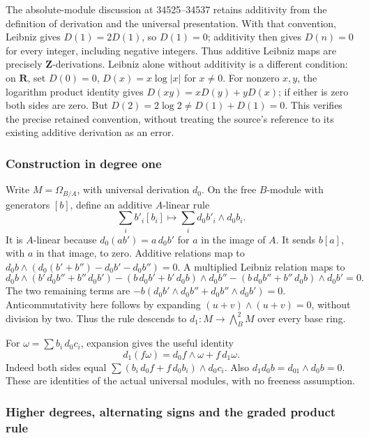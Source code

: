 The absolute-module discussion at 34525--34537 retains additivity from the definition of derivation and the universal presentation. With that convention, Leibniz gives \(D(1)=2D(1)\), so \(D(1)=0\); additivity then gives \(D(n)=0\) for every integer, including negative integers. Thus additive Leibniz maps are precisely \(\mathbf Z\)-derivations. Leibniz alone without additivity is a different condition: on \(\mathbf R\), set \(D(0)=0\), \(D(x)=x\log|x|\) for \(x\ne0\). For nonzero \(x,y\), the logarithm product identity gives \(D(xy)=xD(y)+yD(x)\); if either is zero both sides are zero. But \(D(2)=2\log2\ne D(1)+D(1)=0\). This verifies the precise retained convention, without treating the source's reference to its existing additive derivation as an error.

\subsubsection{Construction in degree one}\label{algebra-proof-042-construction-in-degree-one}

Write \(M=\Omega_{B/A}\), with universal derivation \(d_0\). On the free \(B\)-module with generators \([b]\), define an additive \(A\)-linear rule \[
\sum_i b'_i[b_i]\longmapsto\sum_i d_0b'_i\wedge d_0b_i.
\] It is \(A\)-linear because \(d_0(ab')=a\,d_0b'\) for \(a\) in the image of \(A\). It sends \(b[a]\), with \(a\) in that image, to zero. Additive relations map to \(d_0b\wedge(d_0(b'+b'')-d_0b'-d_0b'')=0\). A multiplied Leibniz relation maps to \[
d_0b\wedge(b'\,d_0b''+b''\,d_0b')
-(b\,d_0b'+b'\,d_0b)\wedge d_0b''
-(b\,d_0b''+b''\,d_0b)\wedge d_0b'=0.
\] The two remaining terms are \(-b(d_0b'\wedge d_0b''+d_0b''\wedge d_0b')=0\). Anticommutativity here follows by expanding \((u+v)\wedge(u+v)=0\), without division by two. Thus the rule descends to \(d_1:M\to\bigwedge_B^2M\) over every base ring.

For \(\omega=\sum b_i\,d_0c_i\), expansion gives the useful identity \[
d_1(f\omega)=d_0f\wedge\omega+f\,d_1\omega.
\] Indeed both sides equal \(\sum (b_i\,d_0f+f\,d_0b_i)\wedge d_0c_i\). Also \(d_1d_0b=d_01\wedge d_0b=0\). These are identities of the actual universal modules, with no freeness assumption.

\subsubsection{Higher degrees, alternating signs and the graded product rule}\label{algebra-proof-042-higher-degrees-alternating-signs-and-the-graded-product-rule}

